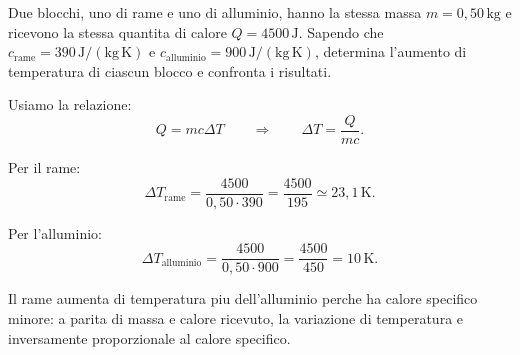 
\begin{esercizio}
Due blocchi, uno di rame e uno di alluminio, hanno la stessa massa
$m=0{,}50\,\mathrm{kg}$ e ricevono la stessa quantita di calore
$Q=4500\,\mathrm{J}$. Sapendo che
$c_{\mathrm{rame}}=390\,\mathrm{J/(kg\,K)}$ e
$c_{\mathrm{alluminio}}=900\,\mathrm{J/(kg\,K)}$, determina l'aumento di
temperatura di ciascun blocco e confronta i risultati.
\end{esercizio}

\begin{soluzione}
Usiamo la relazione:
\[
Q=mc\Delta T
\qquad\Rightarrow\qquad
\Delta T=\frac{Q}{mc}.
\]

Per il rame:
\[
\Delta T_{\mathrm{rame}}=
\frac{4500}{0{,}50\cdot 390}
=\frac{4500}{195}
\simeq 23{,}1\,\mathrm{K}.
\]

Per l'alluminio:
\[
\Delta T_{\mathrm{alluminio}}=
\frac{4500}{0{,}50\cdot 900}
=\frac{4500}{450}
=10\,\mathrm{K}.
\]

Il rame aumenta di temperatura piu dell'alluminio perche ha calore specifico
minore: a parita di massa e calore ricevuto, la variazione di temperatura e
inversamente proporzionale al calore specifico.
\end{soluzione}

